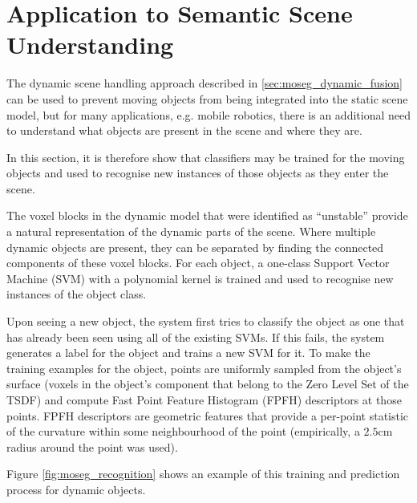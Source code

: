 \section{Application to Semantic Scene Understanding}
\label{sec:moseg_semantic}
The dynamic scene handling approach described in \ref{sec:moseg_dynamic_fusion}
can be used to prevent moving objects from being integrated into the static
scene model, but for many applications, e.g. mobile robotics, there is an
additional need to understand what objects are present in the scene and where
they are.

In this section, it is therefore show that classifiers may be trained for the
moving objects and used to recognise new instances of those objects as they
enter the scene.

The voxel blocks in the dynamic model that were identified as ``unstable''
provide a natural representation of the dynamic parts of the scene. Where
multiple dynamic objects are present, they can be separated by finding the
connected components of these voxel blocks. For each object, a one-class Support
Vector Machine (SVM) \cite{PEGASOS} with a polynomial kernel is trained and used 
to recognise new instances of the object class.

Upon seeing a new object, the system first tries to classify the object as one
that has already been seen using all of the existing SVMs. If this fails, the
system generates a label for the object and trains a new SVM for it. To make the
training examples for the object, points are uniformly sampled from the object's
surface (voxels in the object's component that belong to the Zero Level Set of the 
TSDF) and compute Fast Point Feature Histogram (FPFH) descriptors \cite{Rusu2009} 
at those points. FPFH descriptors are geometric features that provide a
per-point statistic of the curvature within some neighbourhood of the point
(empirically, a $2.5$cm radius around the point was used).

Figure \ref{fig:moseg_recognition} shows an example of this training and
prediction process for dynamic objects.

